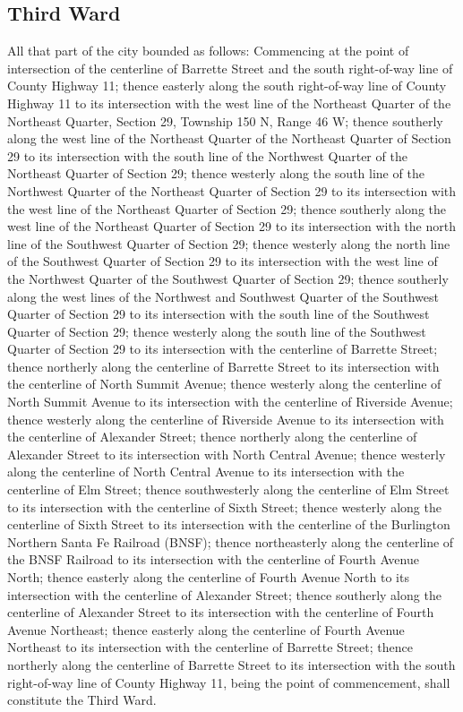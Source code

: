 \subsection{Third Ward}
All that part of the city bounded as follows:  Commencing at the point of intersection of the centerline of Barrette Street and the south right-of-way line of County Highway 11; thence easterly along the south right-of-way line of County Highway 11 to its intersection with the west line of the Northeast Quarter of the Northeast Quarter, Section 29, Township 150 N, Range 46 W; thence southerly along the west line of the Northeast Quarter of the Northeast Quarter of Section 29 to its intersection with the south line of the Northwest Quarter of the Northeast Quarter of Section 29; thence westerly along the south line of the Northwest Quarter of the Northeast Quarter of Section 29 to its intersection with the west line of the Northeast Quarter of Section 29; thence southerly along the west line of the Northeast Quarter of Section 29 to its intersection with the north line of the Southwest Quarter of Section 29; thence westerly along the north line of the Southwest Quarter of Section 29 to its intersection with the west line of the Northwest Quarter of the Southwest Quarter of Section 29; thence southerly along the west lines of the Northwest and Southwest Quarter of the Southwest Quarter of Section 29 to its intersection with the south line of the Southwest Quarter of Section 29; thence westerly along the south line of the Southwest Quarter of Section 29 to its intersection with the centerline of Barrette Street; thence northerly along the centerline of Barrette Street to its intersection with the centerline of North Summit Avenue; thence westerly along the centerline of North Summit Avenue to its intersection with the centerline of Riverside Avenue; thence westerly along the centerline of Riverside Avenue to its intersection with the centerline of Alexander Street; thence northerly along the centerline of Alexander Street to its intersection with North Central Avenue; thence westerly along the centerline of North Central Avenue to its intersection with the centerline of Elm Street; thence southwesterly along the centerline of Elm Street to its intersection with the centerline of Sixth Street; thence westerly along the centerline of Sixth Street to its intersection with the centerline of the Burlington Northern Santa Fe Railroad (BNSF); thence northeasterly along the centerline of the BNSF Railroad to its intersection with the centerline of Fourth Avenue North; thence easterly along the centerline of Fourth Avenue North to its intersection with the centerline of Alexander Street; thence southerly along the centerline of Alexander Street to its intersection with the centerline of Fourth Avenue Northeast; thence easterly along the centerline of Fourth Avenue Northeast to its intersection with the centerline of Barrette Street; thence northerly along the centerline of Barrette Street to its intersection with the south right-of-way line of County Highway 11, being the point of commencement, shall constitute the Third Ward.

